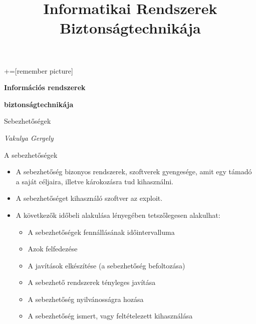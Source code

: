 \documentclass[12 pt]{beamer}
\author{}
\title{Informatikai Rendszerek Biztonságtechnikája}
\institute{}
\date{}
\begin{document}
+=[remember picture]

{

  \begin{frame}[c]
    \begin{center}

      \Large
      \textbf{Információs rendszerek}

      \textbf{biztonságtechnikája}

      \qquad

      Sebezhetőségek

      \qquad

      \textit{Vakulya Gergely}

    \end{center}
  \end{frame}
}


\begin{frame}{A sebezhetőségek}
  \begin{itemize}
    \item{A sebezhetőség bizonyos rendszerek, szoftverek gyengesége, amit egy támadó a saját céljaira, illetve károkozásra tud kihasználni.}
    \item{A sebezhetőséget kihasználó szoftver az exploit.}
    \item{A következők időbeli alakulása lényegében tetszőlegesen alakulhat:}
      \begin{itemize}
        \item{A sebezhetőségek fennállásának időintervalluma}
        \item{Azok felfedezése}
        \item{A javítások elkészítése (a sebezhetőség befoltozása)}
        \item{A sebezhető rendszerek tényleges javítása}
        \item{A sebezhetőség nyilvánosságra hozása}
        \item{A sebezhetőség ismert, vagy feltételezett kihasználása}
      \end{itemize}
  \end{itemize}
\end{frame}
\end{document}
